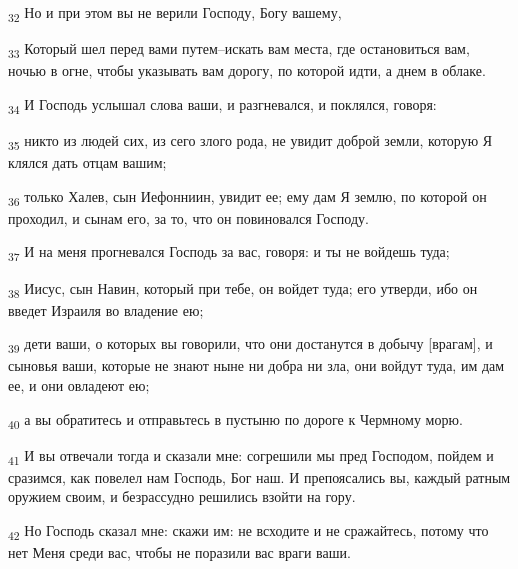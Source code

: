 \begin{tcolorbox}
\textsubscript{32} Но и при этом вы не верили Господу, Богу вашему,
\end{tcolorbox}
\begin{tcolorbox}
\textsubscript{33} Который шел перед вами путем--искать вам места, где остановиться вам, ночью в огне, чтобы указывать вам дорогу, по которой идти, а днем в облаке.
\end{tcolorbox}
\begin{tcolorbox}
\textsubscript{34} И Господь услышал слова ваши, и разгневался, и поклялся, говоря:
\end{tcolorbox}
\begin{tcolorbox}
\textsubscript{35} никто из людей сих, из сего злого рода, не увидит доброй земли, которую Я клялся дать отцам вашим;
\end{tcolorbox}
\begin{tcolorbox}
\textsubscript{36} только Халев, сын Иефонниин, увидит ее; ему дам Я землю, по которой он проходил, и сынам его, за то, что он повиновался Господу.
\end{tcolorbox}
\begin{tcolorbox}
\textsubscript{37} И на меня прогневался Господь за вас, говоря: и ты не войдешь туда;
\end{tcolorbox}
\begin{tcolorbox}
\textsubscript{38} Иисус, сын Навин, который при тебе, он войдет туда; его утверди, ибо он введет Израиля во владение ею;
\end{tcolorbox}
\begin{tcolorbox}
\textsubscript{39} дети ваши, о которых вы говорили, что они достанутся в добычу [врагам], и сыновья ваши, которые не знают ныне ни добра ни зла, они войдут туда, им дам ее, и они овладеют ею;
\end{tcolorbox}
\begin{tcolorbox}
\textsubscript{40} а вы обратитесь и отправьтесь в пустыню по дороге к Чермному морю.
\end{tcolorbox}
\begin{tcolorbox}
\textsubscript{41} И вы отвечали тогда и сказали мне: согрешили мы пред Господом, пойдем и сразимся, как повелел нам Господь, Бог наш. И препоясались вы, каждый ратным оружием своим, и безрассудно решились взойти на гору.
\end{tcolorbox}
\begin{tcolorbox}
\textsubscript{42} Но Господь сказал мне: скажи им: не всходите и не сражайтесь, потому что нет Меня среди вас, чтобы не поразили вас враги ваши.
\end{tcolorbox}
